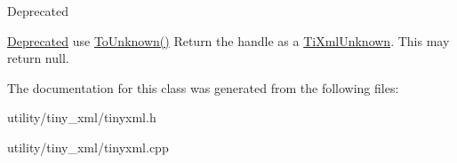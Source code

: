 \begin{DoxyRefDesc}{Deprecated}
\item[\hyperlink{deprecated__deprecated000004}{Deprecated}]use \hyperlink{class_ti_xml_handle_a450ec91dac1ded02d72eb918d062ad31}{To\+Unknown()} Return the handle as a \hyperlink{class_ti_xml_unknown}{Ti\+Xml\+Unknown}. This may return null. \end{DoxyRefDesc}


The documentation for this class was generated from the following files\+:\begin{DoxyCompactItemize}
\item 
utility/tiny\+\_\+xml/tinyxml.\+h\item 
utility/tiny\+\_\+xml/tinyxml.\+cpp\end{DoxyCompactItemize}
